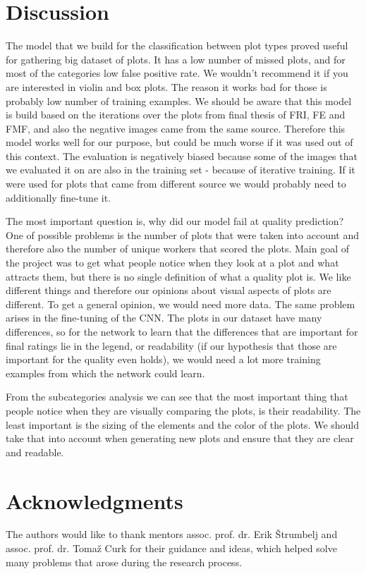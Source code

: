 \documentclass[fleqn,moreauthors,10pt]{ds_report}
\begin{document}
\section*{Discussion}
The model that we build for the classification between plot types proved useful for gathering big dataset of plots. It has a low number of missed plots, and for most of the categories low false positive rate. We wouldn't recommend it if you are interested in violin and box plots. The reason it works bad for those is probably low number of training examples. We should be aware that this model is build based on the iterations over the plots from final thesis of FRI, FE and FMF, and also the negative images came from the same source. Therefore this model works well for our purpose, but could be much worse if it was used out of this context. The evaluation is negatively biased because some of the images that we evaluated it on are also in the training set - because of iterative training. If it were used for plots that came from different source we would probably need to additionally fine-tune it.

The most important question is, why did our model fail at quality prediction? One of possible problems is the number of plots that were taken into account and therefore also the number of unique workers that scored the plots. Main goal of the project was to get what people notice when they look at a plot and what attracts them, but there is no single definition of what a quality plot is. We like different things and therefore our opinions about visual aspects of plots are different. To get a general opinion, we would need more data. The same problem arises in the fine-tuning of the CNN. The plots in our dataset have many differences, so for the network to learn that the differences that are important for final ratings lie in the legend, or readability (if our hypothesis that those are important for the quality even holds), we would need a lot more training examples from which the network could learn.

From the subcategories analysis we can see that the most important thing that people notice when they are visually comparing the plots, is their readability. The least important is the sizing of the elements and the color of the plots. We should take that into account when generating new plots and ensure that they are clear and readable.


\section*{Acknowledgments}
The authors would like to thank mentors assoc. prof. dr. Erik Štrumbelj and assoc. prof. dr. Tomaž Curk for their guidance and ideas, which helped solve many problems that arose during the research process.



\end{document}
